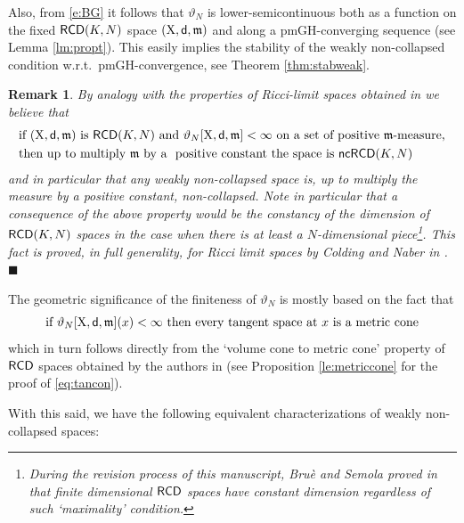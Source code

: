 \documentclass[reqno,11pt]{article}
\numberwithin{equation}{section}
\newcommand{\mm}{{\mbox{\boldmath$m$}}}
\newcommand{\sfd}{{\sf d}}
\newcommand{\fr}{\penalty-20\null\hfill$\blacksquare$}                      %
\renewcommand{\mm}{\mathfrak m}                                %
\newtheorem{remark}[theorem]{Remark}
\newcommand{\X}{{\rm X}}
\newcommand{\RCD}{{\sf RCD}}
\newcommand{\ncRCD}{{\sf ncRCD}}
\begin{document}
Also, from \eqref{e:BG} it follows that $\vartheta_{N}$ is lower-semicontinuous both as a function on the fixed $\RCD(K,N)$ space $(\X,\sfd,\mm)$ and along a pmGH-converging sequence (see Lemma \ref{lm:propt}). This easily implies  the stability of the weakly non-collapsed condition  w.r.t.\ pmGH-convergence, see Theorem \ref{thm:stabweak}.
\begin{remark}{\rm
By analogy with the properties of Ricci-limit spaces obtained in \cite{Cheeger-Colding96,Cheeger-Colding97I,Cheeger-Colding97II,Cheeger-Colding97III,ColdingNaber12} we believe that 
\[
\begin{split}
&\text{if $(\X,\sfd,\mm)$ is  $\RCD(K,N)$ and $\vartheta_{N}[\X,\sfd,\mm]<\infty$ on a set of positive $\mm$-measure,}\\
&\text{then up to multiply $\mm$ by a { positive constant} the space is $\ncRCD(K,N)$}
\end{split}
\]
and in particular that any weakly non-collapsed space is, up to multiply the measure by a positive constant,  non-collapsed. Note in particular that a consequence of the above property would be the constancy of the dimension of \(\RCD(K,N)\) spaces in the case when there is at least a \(N\)-dimensional piece\footnote{During the revision process of this manuscript, Bru\`e and Semola proved in \cite{BS18} that finite dimensional $\RCD$ spaces have constant dimension regardless of such `maximality' condition.}. This fact is proved, in full generality,  for  Ricci limit spaces by Colding and Naber in \cite{ColdingNaber12}. 
}\fr\end{remark}
The geometric significance of the finiteness of $\vartheta_N$ is mostly based on the fact that
\begin{equation}
\label{eq:tancon}
\text{if $\vartheta_N[\X,\sfd,\mm](x)<\infty$ then every tangent space at $x$ is a metric cone}
\end{equation}
which in turn follows directly from the `volume cone to metric cone' property of $\RCD$ spaces obtained by the authors in \cite[Theorem 1.1]{DPG16} (see Proposition \ref{le:metriccone} for the proof of \eqref{eq:tancon}).


With this said, we have the following equivalent characterizations  of weakly non-collapsed spaces:
\end{document}
